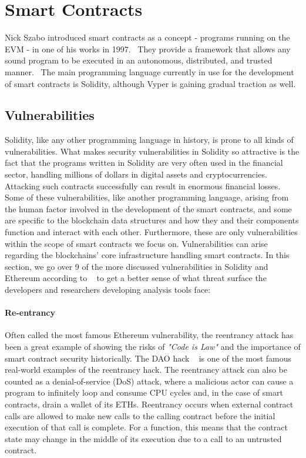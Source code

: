 \section{Smart Contracts}
    Nick Szabo introduced smart contracts as a concept - programs running on the EVM - in one of his works in 1997.~\cite{szabo1997formalizing}
    They provide a framework that allows any sound program to be executed in an autonomous, distributed, and trusted manner.~\cite{nguyen2020sfuzz}
    The main programming language currently in use for the development of smart contracts is Solidity, although Vyper is gaining gradual traction as well.

    \subsection{Vulnerabilities}
        Solidity, like any other programming language in history, is prone to all kinds of vulnerabilities.
        What makes security vulnerabilities in Solidity so attractive is the fact that the programs written in Solidity are very often used in the financial sector,
        handling millions of dollars in digital assets and cryptocurrencies. Attacking such contracts successfully can result in enormous financial losses.
        Some of these vulnerabilities, like another programming language, arising from the human factor involved in the development of the smart contracts, and some are specific to the blockchain data structures and how they and their components function and interact with each other.
        Furthermore, these are only vulnerabilities within the scope of smart contracts we focus on. Vulnerabilities can arise regarding the blockchains' core infrastructure handling smart contracts.
        In this section, we go over 9 of the more discussed vulnerabilities in Solidity and Ethereum according to ~\cite{dasp} to get a better sense of what threat surface the developers and researchers developing analysis tools face:

            \paragraph{Re-entrancy}
            Often called the most famous Ethereum vulnerability, the reentrancy attack has been a great example of showing the risks of \textit{"Code is Law"} and the importance of smart contract security historically.
            The DAO hack ~\cite{dhillon2017dao} is one of the most famous real-world examples of the reentrancy hack.
            The reentrancy attack can also be counted as a denial-of-service (DoS) attack, where a malicious actor can cause a program to infinitely loop and consume CPU cycles and, in the case of smart contracts, drain a wallet of its ETHs.
            Reentrancy occurs when external contract calls are allowed to make new calls to the calling contract before the initial execution of that call is complete.
            For a function, this means that the contract state may change in the middle of its execution due to a call to an untrusted contract. ~\cite{dasp}

